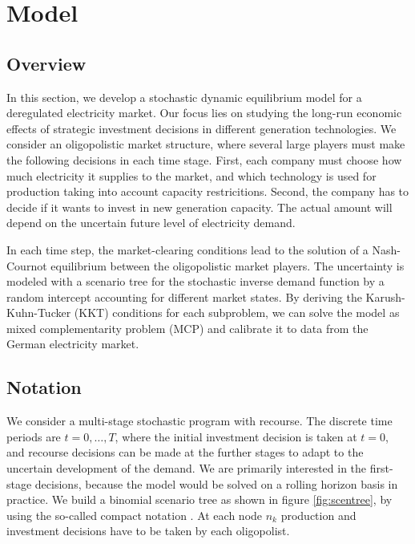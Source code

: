 \section{Model}
\label{sec:model}

\subsection{Overview}

In this section, we develop a stochastic dynamic equilibrium model for a deregulated electricity market. Our focus lies on studying the long-run economic effects of strategic investment decisions in different generation technologies. We consider an oligopolistic market structure, where several large players must make the following decisions in each time stage. First, each company must choose how much electricity it supplies to the market, and which technology is used for production taking into account capacity restricitions. Second, the company has to decide if it wants to invest in new generation capacity. The actual amount will depend on the uncertain future level of electricity demand.

In each time step, the market-clearing conditions lead to the solution of a Nash-Cournot equilibrium between the oligopolistic market players. The uncertainty is modeled with a scenario tree for the stochastic inverse demand function by a random intercept accounting for different market states. By deriving the Karush-Kuhn-Tucker (KKT) conditions for each subproblem, we can solve the model as mixed complementarity problem (MCP) and calibrate it to data from the German electricity market.

\subsection{Notation}

We consider a multi-stage stochastic program with recourse. The discrete time periods are $t=0,\dots,T$, where the initial investment decision is taken at $t=0$, and recourse decisions can be made at the further stages to adapt to the uncertain development of the demand. We are primarily interested in the first-stage decisions, because the model would be solved on a rolling horizon basis in practice. We build a binomial scenario tree as shown in figure \ref{fig:scentree}, by using the so-called compact notation \cite[see e.g.][]{Brandimarte2006}.  At each node $n_k$ production and investment decisions have to be taken by each oligopolist.

